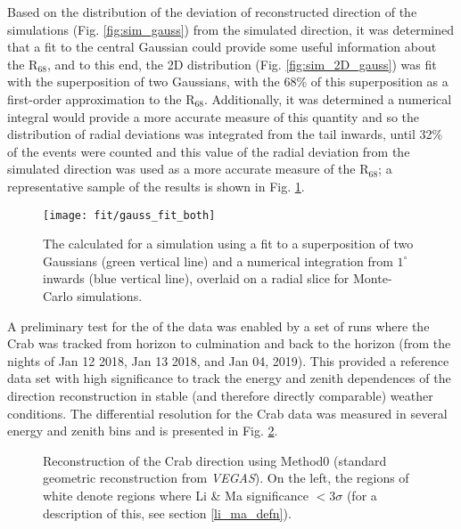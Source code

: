 \documentclass[main.tex]{subfiles}
\begin{document}
Based on the distribution of the deviation of reconstructed direction of the simulations (Fig. \ref{fig:sim_gauss}) from the simulated direction, it was determined that a fit to the central Gaussian could provide some useful information about the R$_{68}$, and to this end, the 2D distribution (Fig. \ref{fig:sim_2D_gauss}) was fit with the superposition of two Gaussians, with the 68\% of this superposition as a first-order approximation to the R$_{68}$. Additionally, it was determined a numerical integral would provide a more accurate measure of this quantity and so the distribution of radial deviations was integrated from the tail inwards, until 32\% of the events were counted and this value of the radial deviation from the simulated direction was used as a more accurate measure of the R$_{68}$; a representative sample of the results is shown in Fig. \ref{fig:gauss_fit_both}.
\begin{figure}[htbp]
  \centering
  \texttt{[image: fit/gauss\_fit\_both]}
  \caption[\rse from the Gaussian fit and the numerical integral.]{The \rse calculated for a simulation using a fit to a superposition of two Gaussians (green vertical line) and a numerical integration from $1^\circ$ inwards (blue vertical line), overlaid on a radial slice for Monte-Carlo simulations.}
  \label{fig:gauss_fit_both}
\end{figure}

A preliminary test for the \rse of the data was enabled by a set of runs where the Crab was tracked from horizon to culmination and back to the horizon (from the nights of Jan 12 2018, Jan 13 2018, and Jan 04, 2019). This provided a reference data set with high significance to track the energy and zenith dependences of the direction reconstruction in stable (and therefore directly comparable) weather conditions. The differential resolution for the Crab data was measured in several energy and zenith bins and is presented in Fig. \ref{fig:crab_initial}.

\begin{figure}[H]
  \begin{center}
  \end{center}
  \caption[Crab direction reconstruction using Method0.]{Reconstruction of the Crab direction using Method0 (standard geometric reconstruction from \textit{VEGAS}). On the left, the regions of white denote regions where Li \& Ma significance $<3\sigma$ (for a description of this, see section \ref{li_ma_defn}).}
  \label{fig:crab_initial}
\end{figure}
\end{document}
